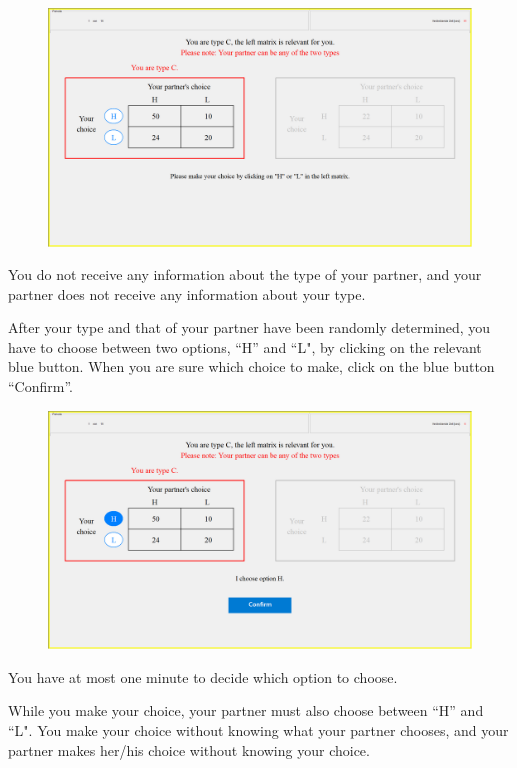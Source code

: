 \documentclass[12pt]{article}
\theoremstyle{break}
\begin{document}
\begin{figure}[h]
  \centering
    \includegraphics[width=1\textwidth]{fig1-NC-instructions.png}
  \label{fig:fig1-NC-instructions}
\end{figure}




You do not receive any information about the type of your partner, and your partner does not receive any information about your type. 

After your type and that of your partner have been randomly determined, you have to choose between two options, ``H'' and ``L", by clicking on the relevant blue button. When you are sure which choice to make, click on the blue button ``Confirm''.

 \begin{figure}[h]
   \centering
     \includegraphics[width=.9\textwidth]{fig2-NC-instructions.png}
   \label{fig:fig2-NC-instructions}
 \end{figure}
 



You have at most one minute to decide which option to choose.

While you make your choice, your partner must also choose between ``H'' and ``L". You make your choice without knowing what your partner chooses, and your partner makes her/his choice without knowing your choice. 
\end{document}
